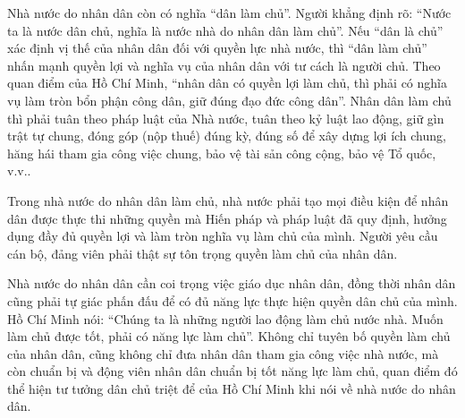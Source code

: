 Nhà nước do nhân dân còn có nghĩa ``dân làm chủ''. Người khẳng định rõ: ``Nước ta là nước dân chủ, nghĩa là nước nhà do nhân dân làm chủ''. Nếu ``dân là chủ'' xác định vị thế của nhân dân đối với quyền lực nhà nước, thì ``dân làm chủ'' nhấn mạnh quyền lợi và nghĩa vụ của nhân dân với tư cách là người chủ. Theo quan điểm của Hồ Chí Minh, ``nhân dân có quyền lợi làm chủ, thì phải có nghĩa vụ làm tròn bổn phận công dân, giữ đúng đạo đức công dân''. Nhân dân làm chủ thì phải tuân theo pháp luật của Nhà nước, tuân theo kỷ luật lao động, giữ gìn trật tự chung, đóng góp (nộp thuế) đúng kỳ, đúng số để xây dựng lợi ích chung, hăng hái tham gia công việc chung, bảo vệ tài sản công cộng, bảo vệ Tổ quốc, v.v..

Trong nhà nước do nhân dân làm chủ, nhà nước phải tạo mọi điều kiện để nhân dân được thực thi những quyền mà Hiến pháp và pháp luật đã quy định, hưởng dụng đầy đủ quyền lợi và làm tròn nghĩa vụ làm chủ của mình. Người yêu cầu cán bộ, đảng viên phải thật sự tôn trọng quyền làm chủ của nhân dân.

Nhà nước do nhân dân cần coi trọng việc giáo dục nhân dân, đồng thời nhân dân cũng phải tự giác phấn đấu để có đủ năng lực thực hiện quyền dân chủ của mình. Hồ Chí Minh nói: ``Chúng ta là những người lao động làm chủ nước nhà. Muốn làm chủ được tốt, phải có năng lực làm chủ''. Không chỉ tuyên bố quyền làm chủ của nhân dân, cũng không chỉ đưa nhân dân tham gia công việc nhà nước, mà còn chuẩn bị và động viên nhân dân chuẩn bị tốt năng lực làm chủ, quan điểm đó thể hiện tư tưởng dân chủ triệt để của Hồ Chí Minh khi nói về nhà nước do nhân dân.

